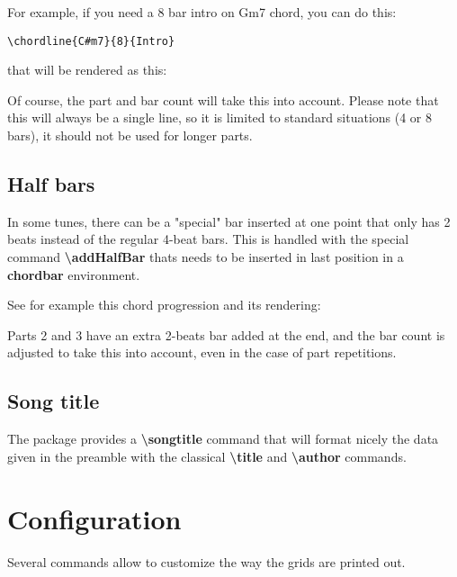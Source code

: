 \documentclass[11pt]{article}
\newcommand{\btt}{\bfseries \ttfamily }
\newcommand{\tbs}{\textbackslash{}}
\begin{document}
For example, if you need a 8 bar intro on Gm7 chord, you can do this:
\begin{lstlisting}
\chordline{C#m7}{8}{Intro}
\end{lstlisting}

that will be rendered as this:


Of course, the part and bar count will take this into account.
Please note that this will always be a single line, so it is limited to standard situations (4 or 8 bars), it should not be used for longer parts.

\subsection{Half bars}

In some tunes, there can be a "special" bar inserted at one point that only has 2 beats instead of the regular 4-beat bars.
This is handled with the special command {\btt \tbs addHalfBar} thats needs to be inserted in last position in a {\btt chordbar} environment.

See for example this chord progression and its rendering:



\resetchordbars
\countbarsYes


Parts 2 and 3 have an extra 2-beats bar added at the end, and the bar count is adjusted to take this into account, even in the case of part repetitions.

\subsection{Song title}

The package provides a {\btt \tbs songtitle} command that will format nicely the data given in the preamble with the classical 
{\btt \tbs title} and {\btt \tbs author} commands.


\section{Configuration}
\label{sec:config}

Several commands allow to customize the way the grids are printed out.
\end{document}
